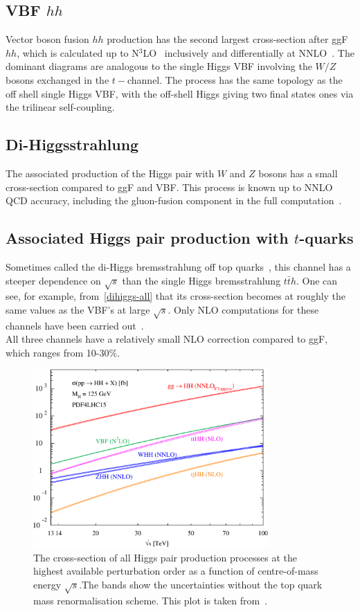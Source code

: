 \subsection{VBF $hh$}
Vector boson fusion $hh$ production has the second largest cross-section after ggF $hh$, which is calculated up to N$^3$LO~\cite{Baglio:2012np,Ling:2014sne,Dreyer:2018qbw} inclusively and differentially at NNLO~\cite{Dreyer:2018rfu}. The dominant diagrams are analogous to the single Higgs VBF involving the $W/Z$ bosons exchanged in the $t-$channel. The process has the same topology as the off shell single Higgs VBF, with the off-shell Higgs giving two final states ones via the trilinear self-coupling. 
\subsection{Di-Higgsstrahlung}
The associated production of the Higgs pair with $W$ and $Z$ bosons has a small cross-section compared to ggF and VBF. This process is known up to NNLO QCD accuracy, including the gluon-fusion component in the full computation~\cite{Li:2016nrr, Li:2017lbf}. 
\subsection{Associated Higgs pair production with $t$-quarks}
Sometimes called the di-Higgs bremsstrahlung off top quarks~\cite{DiMicco:2019ngk}, this channel has a steeper dependence on $\sqrt{s}$ than the single Higgs bremsstrahlung $t\bar t h$. One can see, for example, from~\autoref{dihiggs-all} that its cross-section becomes at roughly the same values as the VBF's at large $\sqrt{s}$. Only NLO computations for these channels have been carried out~\cite{Frederix:2014hta}. \\ All three channels have a relatively small NLO correction compared to ggF, which ranges from 10-30\%. 
\begin{figure}[!htpb]
	\centering
	\includegraphics[width = 0.8\textwidth]{./figures/cxn_HH}
	\caption{The cross-section of all Higgs pair production processes at the highest available perturbation order as a function of centre-of-mass energy $\sqrt{s}$.The bands show the uncertainties without the top quark mass renormalisation scheme. This plot is taken from~\cite{DiMicco:2019ngk}.} 
	\label{dihiggs-all}
\end{figure}
%


